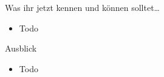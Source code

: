\section{}
	\begin{frame}{Was ihr jetzt kennen und können solltet\dots}
			\begin{itemize}
				\item Todo
			\end{itemize}
	
	\end{frame}
	\begin{frame}{Ausblick}
		\begin{itemize}
			\item Todo
		\end{itemize}
	\end{frame}
\section{}
\questionframe
\lastframe
{}

